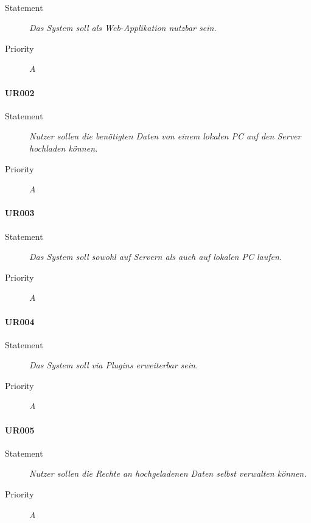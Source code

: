 \paragraph{\ur}
\begin{description}
\item [Statement] \textit{Das System soll als \gls{Web-Applikation} nutzbar sein.}
\item [Priority] \textit{A}
\end{description}

\paragraph{UR002}
\begin{description}
\item[Statement] \textit{Nutzer sollen die benötigten Daten von einem lokalen PC auf den Server hochladen können.}
\item[Priority] \textit{A}
\end{description}

\paragraph{UR003}
\begin{description}
\item[Statement] \textit{Das System soll sowohl auf Servern als auch auf lokalen PC laufen.}
\item[Priority] \textit{A}
\end{description}

\paragraph{UR004}
\begin{description}
\item[Statement] \textit{Das System soll via \gls{Plugins} erweiterbar sein.}
\item[Priority] \textit{A}
\end{description}

\paragraph{UR005}
\begin{description}
\item[Statement] \textit{Nutzer sollen die Rechte an hochgeladenen Daten selbst verwalten können.}
\item[Priority] \textit{A}
\end{description}

